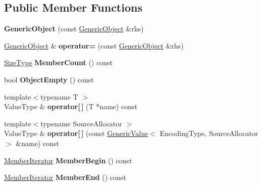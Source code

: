 \subsection*{Public Member Functions}
\begin{DoxyCompactItemize}
\item 
{\bfseries Generic\+Object} (const \hyperlink{a00120}{Generic\+Object} \&rhs)\hypertarget{a00120_a10173c42d0e8a71ca0e3ae75d800887a}{}\label{a00120_a10173c42d0e8a71ca0e3ae75d800887a}

\item 
\hyperlink{a00120}{Generic\+Object} \& {\bfseries operator=} (const \hyperlink{a00120}{Generic\+Object} \&rhs)\hypertarget{a00120_af8984f76d6f3b13039c6d3b8e217f747}{}\label{a00120_af8984f76d6f3b13039c6d3b8e217f747}

\item 
\hyperlink{a00677_a5ed6e6e67250fadbd041127e6386dcb5}{Size\+Type} {\bfseries Member\+Count} () const \hypertarget{a00120_ab3772740b811ed417924cebdace1d190}{}\label{a00120_ab3772740b811ed417924cebdace1d190}

\item 
bool {\bfseries Object\+Empty} () const \hypertarget{a00120_a410e5dfd7fa047852ecb4b719a74f842}{}\label{a00120_a410e5dfd7fa047852ecb4b719a74f842}

\item 
{\footnotesize template$<$typename T $>$ }\\Value\+Type \& {\bfseries operator\mbox{[}$\,$\mbox{]}} (T $\ast$name) const \hypertarget{a00120_af3db47f1615353d0c5ce974c2fbe7885}{}\label{a00120_af3db47f1615353d0c5ce974c2fbe7885}

\item 
{\footnotesize template$<$typename Source\+Allocator $>$ }\\Value\+Type \& {\bfseries operator\mbox{[}$\,$\mbox{]}} (const \hyperlink{a00130}{Generic\+Value}$<$ Encoding\+Type, Source\+Allocator $>$ \&name) const \hypertarget{a00120_aac0937f20bfdc94380641bb02cefbf98}{}\label{a00120_aac0937f20bfdc94380641bb02cefbf98}

\item 
\hyperlink{a00118}{Member\+Iterator} {\bfseries Member\+Begin} () const \hypertarget{a00120_abf56b2ac9cface0dffd21b541acb9511}{}\label{a00120_abf56b2ac9cface0dffd21b541acb9511}

\item 
\hyperlink{a00118}{Member\+Iterator} {\bfseries Member\+End} () const \hypertarget{a00120_a7dedae79a478db0aeb4e01df4c788f3a}{}\label{a00120_a7dedae79a478db0aeb4e01df4c788f3a}


\end{DoxyCompactItemize}
